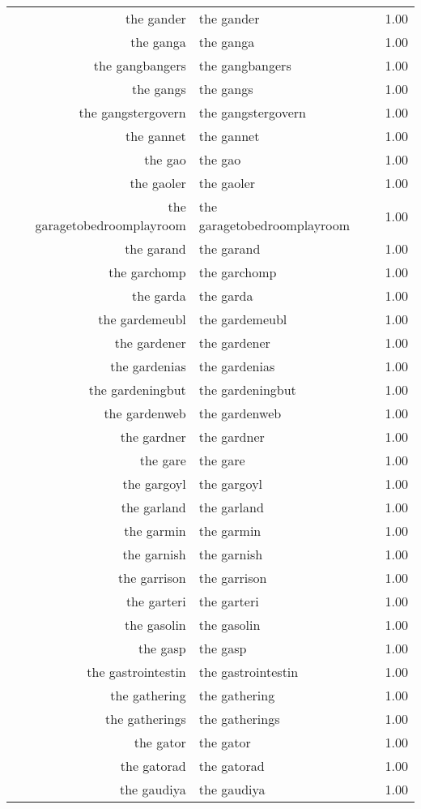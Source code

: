 \begin{table}[ht]
\begin{tabular}{rlr}
  the gander & the gander & 1.00 \\ 
  the ganga & the ganga & 1.00 \\ 
  the gangbangers & the gangbangers & 1.00 \\ 
  the gangs & the gangs & 1.00 \\ 
  the gangstergovern & the gangstergovern & 1.00 \\ 
  the gannet & the gannet & 1.00 \\ 
  the gao & the gao & 1.00 \\ 
  the gaoler & the gaoler & 1.00 \\ 
  the garagetobedroomplayroom & the garagetobedroomplayroom & 1.00 \\ 
  the garand & the garand & 1.00 \\ 
  the garchomp & the garchomp & 1.00 \\ 
  the garda & the garda & 1.00 \\ 
  the gardemeubl & the gardemeubl & 1.00 \\ 
  the gardener & the gardener & 1.00 \\ 
  the gardenias & the gardenias & 1.00 \\ 
  the gardeningbut & the gardeningbut & 1.00 \\ 
  the gardenweb & the gardenweb & 1.00 \\ 
  the gardner & the gardner & 1.00 \\ 
  the gare & the gare & 1.00 \\ 
  the gargoyl & the gargoyl & 1.00 \\ 
  the garland & the garland & 1.00 \\ 
  the garmin & the garmin & 1.00 \\ 
  the garnish & the garnish & 1.00 \\ 
  the garrison & the garrison & 1.00 \\ 
  the garteri & the garteri & 1.00 \\ 
  the gasolin & the gasolin & 1.00 \\ 
  the gasp & the gasp & 1.00 \\ 
  the gastrointestin & the gastrointestin & 1.00 \\ 
  the gathering & the gathering & 1.00 \\ 
  the gatherings & the gatherings & 1.00 \\ 
  the gator & the gator & 1.00 \\ 
  the gatorad & the gatorad & 1.00 \\ 
  the gaudiya & the gaudiya & 1.00 \\ 

\end{tabular}
\end{table}

